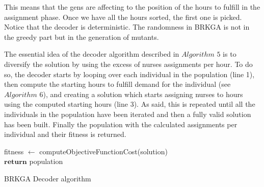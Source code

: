 This means that the gens are affecting to the position of the hours to fulfill in the assignment phase. Once we have all the hours sorted, the first one is picked. Notice that the decoder is deterministic. The randomness in BRKGA is not in the greedy part but in the generation of mutants.

The essential idea of the decoder algorithm described in $Algorithm$ $5$ is to diversify the solution by using the excess of nurses assignments per hour. To do so, the decoder starts by looping over each individual in the population (line 1), then compute the starting hours to fulfill demand for the individual (see $Algorithm$ $6$), and creating a solution which starts assigning nurses to hours using the computed starting hours (line 3). As said, this is repeated until all the individuals in the population have been iterated and then a fully valid solution has been built. Finally the population with the calculated assignments per individual and their fitness is returned.

\begin{algorithm}[H]


fitness $\leftarrow$ computeObjectiveFunctionCost(solution)\\
$\textbf{return}$ population
\caption{BRKGA Decoder algorithm}\label{alg.mainLoop}
\end{algorithm}

